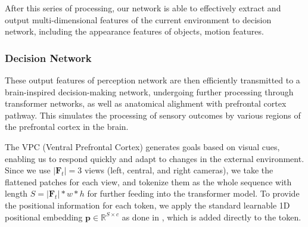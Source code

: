 %
After this series of processing, our network is able to effectively extract and output multi-dimensional features of the current environment to decision network, including the appearance features of objects, motion features.




\subsubsection{Decision Network}
These output features of perception network are then efficiently transmitted to a brain-inspired decision-making network, undergoing further processing through transformer networks, as well as anatomical alighment with prefrontal cortex pathway.
This simulates the processing of sensory outcomes by various regions of the prefrontal cortex in the brain. 
%


The VPC (Ventral Prefrontal Cortex) generates goals based on visual cues, enabling us to respond quickly and adapt to changes in the external environment. 
%
Since we use $|\mathbf{F}_{t}|=3$ views (left, central, and right cameras), we take the flattened patches for each view, and tokenize them as the whole sequence with length $S=|\mathbf{F}_t|*w*h$ for further feeding into the transformer model. 
To provide the positional information for each token, we apply the standard learnable 1D positional embedding $\mathbf{p}\in \mathbb{R}^{S\times c}$ as done in \cite{Alexey:2021}, which is added directly to the token. 


